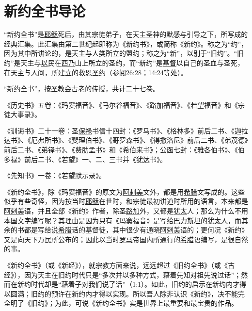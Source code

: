 \chapter*{新约全书导论}


“新约全书”是\uline{耶稣}死后，由其宗徒弟子，在天主圣神的默感与引导之下，所写成的经典汇集。此汇集由第二世纪起即称为《新约书》，或简称《新约》。称之为“约”，因为其中所讲论的，是天主与人类所立的盟约；称之为“新”，以别于“旧约”。“旧约”是天主与\uline{以}民在\uline{西乃}山上所立的圣约，而“新约”是\uline{基督}以自己的圣血与圣死，在天主与人间，所建立的救恩圣约（参阅26:28；14:24等处）。

“新约全书”，按圣教会古老的传授，共计二十七卷。

《历史书》五卷：《玛窦福音》、《马尔谷福音》、《路加福音》、《若望福音》和《宗徒大事录》。

《训诲书》二十一卷：圣\uline{保禄}书信十四封：《罗马书》、《格林多》前后二书、《迦拉达书》、《厄弗所书》、《斐理伯书》、《哥罗森书》、《得撒洛尼》前后二书、《弟茂德》前后二书、《弟铎书》、《费肋孟书》和《希伯来书》；公函七封：《雅各伯书》、《伯多禄》前后二书、《若望》一、二、三书并《犹达书》。

《先知书》一卷：《若望默示录》。

《新约全书》，除《玛窦福音》的原文为\uline{阿剌美}文外，都是用\uline{希腊}文写成的。这些似乎有些奇怪，因为按当时\uline{耶稣}在世时，和宗徒最初讲道时所用的语言，本来都是\uline{阿剌美}语，并且全部《新约》作者，除圣\uline{路加}外，又都是\uline{犹太}人；那么为什么不用本国文字编写呢？其理由是因为只有《玛窦福音》是写给\uline{巴力斯坦}的\uline{犹太}人，而其余的书都是写给说\uline{希腊}话的基督徒，其中很少有通晓\uline{阿剌美}语的；更何况《新约》又是向天下万民所公布的；因此以当时\uline{罗马}帝国内所通行的\uline{希腊}语编写，是很自然的事。

《新约全书》（或《新经》），就宗教方面来说，远远超过《旧约全书》（或《古经》），因为天主在旧约时代只是“多次并以多种方式，藉着先知对祖先说过话”；然而在新约时代却是“藉着子对我们说了话”（1:1）。如此，旧约的启示在新约内才得以圆满；旧约的预许在新约内才得以实现。所以吾人除非认识《新约》，决不能完全明了《旧约》；为此，可说《新约全书》实是世界上最重要和最宝贵的作品。
